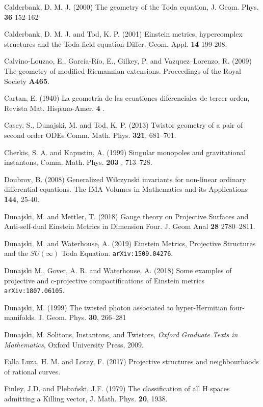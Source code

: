 \begin{thebibliography}{}
 Calderbank, D. M. J. (2000) The geometry of the Toda 
equation, J. Geom. Phys. {\bf 36}  152-162


 Calderbank, D. M. J. and Tod,  K. P. (2001)
Einstein metrics, hypercomplex structures and the Toda field equation
Differ. Geom. Appl. {\bf 14}  199-208.


 Calvino-Louzao, E., Garc\' ia-R\' io, E., Gilkey, P. and Vazquez--Lorenzo, R. (2009) The geometry of modified Riemannian extensions. Proceedings of the Royal Society {\bf A465}.

 Cartan, E. (1940) {La geometria de las ecuationes diferenciales de tercer
orden}, Revista Mat. Hispano-Amer. {\bf 4} .


 Casey, S., Dunajski, M. and Tod, K. P. (2013)
Twistor geometry of a pair of second order ODEs 
Comm. Math. Phys. { \bf 321}, 681--701.



 Cherkis, S. A.  and Kapustin, A. (1999) Singular monopoles and gravitational
instantons, Comm. Math. Phys. {\bf 203} , 713–728.


Doubrov, B. (2008) Generalized Wilczynski invariants for non-linear ordinary differential equations.
The IMA Volumes in Mathematics and its Applications {\bf 144}, 25-40.

 Dunajski, M. and Mettler, T. (2018) Gauge theory on Projective Surfaces and Anti-self-dual Einstein Metrics in Dimension Four.  
 J. Geom Anal {\bf 28} 2780--2811.
 
 Dunajski, M. and Waterhouse, A. (2019)
Einstein Metrics, Projective Structures and the $SU(\infty)$ Toda Equation.
{\tt{arXiv:1509.04276}}.
 

 Dunajski M., Gover, A. R. and Waterhouse, A. (2018) Some examples of projective and c-projective compactifications of Einstein metrics  {\tt arXiv:1807.06105}.

 Dunajski, M. (1999) The twisted photon associated to hyper-Hermitian four-manifolds. J. Geom. Phys. {\bf 30}, 266--281

 Dunajski, M. Solitons, Instantons, and Twistors, {\em Oxford Graduate Texts in Mathematics}, Oxford University Press, 2009.

 Falla Luza, H. M. and Loray, F. (2017)  Projective structures and neighbourhoods of rational curves.

 Finley, J.D. and Pleba\'nski, J.F. (1979) The classification of all H spaces admitting a Killing
vector, J. Math. Phys. {\bf 20}, 1938.


\end{thebibliography}
